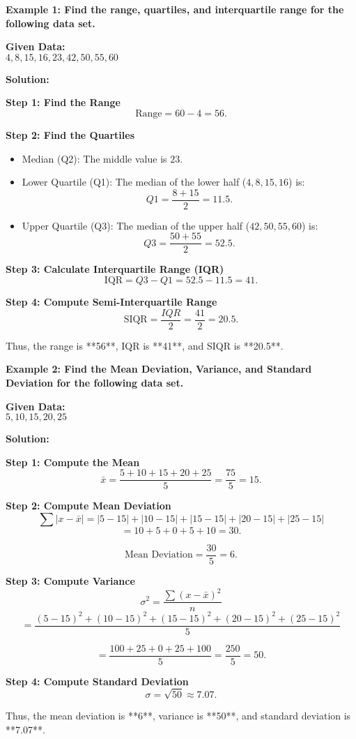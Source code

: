 \begin{flushleft}
	\textbf{Example 1: Find the range, quartiles, and interquartile range for the following data set.}
	
	\textbf{Given Data:} \\ 
	$4, 8, 15, 16, 23, 42, 50, 55, 60$
	
	\vspace{0.5cm}
	\textbf{Solution:}
	
	\textbf{Step 1: Find the Range}
	\[
	\text{Range} = 60 - 4 = 56.
	\]
	
	\textbf{Step 2: Find the Quartiles}
	\begin{itemize}
		\item Median (Q2): The middle value is $23$.
		\item Lower Quartile (Q1): The median of the lower half ($4, 8, 15, 16$) is:
		\[
		Q1 = \frac{8+15}{2} = 11.5.
		\]
		\item Upper Quartile (Q3): The median of the upper half ($42, 50, 55, 60$) is:
		\[
		Q3 = \frac{50+55}{2} = 52.5.
		\]
	\end{itemize}
	
	\textbf{Step 3: Calculate Interquartile Range (IQR)}
	\[
	\text{IQR} = Q3 - Q1 = 52.5 - 11.5 = 41.
	\]
	
	\textbf{Step 4: Compute Semi-Interquartile Range}
	\[
	\text{SIQR} = \frac{IQR}{2} = \frac{41}{2} = 20.5.
	\]
	
	Thus, the range is **56**, IQR is **41**, and SIQR is **20.5**.
\end{flushleft}

\begin{flushleft}
	\textbf{Example 2: Find the Mean Deviation, Variance, and Standard Deviation for the following data set.}
	
	\textbf{Given Data:} \\ 
	$5, 10, 15, 20, 25$
	
	\vspace{0.5cm}
	\textbf{Solution:}
	
	\textbf{Step 1: Compute the Mean}
	\[
	\bar{x} = \frac{5+10+15+20+25}{5} = \frac{75}{5} = 15.
	\]
	
	\textbf{Step 2: Compute Mean Deviation}
	\[
	\sum |x - \bar{x}| = |5-15| + |10-15| + |15-15| + |20-15| + |25-15|
	\]
	\[
	= 10 + 5 + 0 + 5 + 10 = 30.
	\]
	
	\[
	\text{Mean Deviation} = \frac{30}{5} = 6.
	\]
	
	\textbf{Step 3: Compute Variance}
	\[
	\sigma^2 = \frac{\sum (x - \bar{x})^2}{n}
	\]
	\[
	= \frac{(5-15)^2 + (10-15)^2 + (15-15)^2 + (20-15)^2 + (25-15)^2}{5}
	\]
	
	\[
	= \frac{100 + 25 + 0 + 25 + 100}{5} = \frac{250}{5} = 50.
	\]
	
	\textbf{Step 4: Compute Standard Deviation}
	\[
	\sigma = \sqrt{50} \approx 7.07.
	\]
	
	Thus, the mean deviation is **6**, variance is **50**, and standard deviation is **7.07**.
\end{flushleft}
